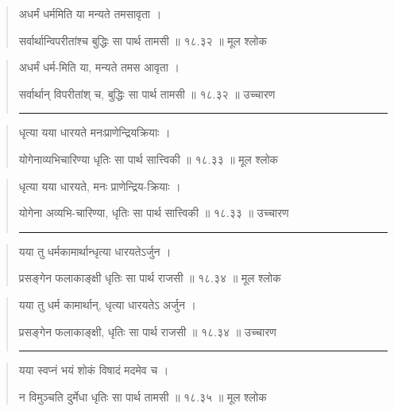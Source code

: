 \begin{quotation}

अधर्मं धर्ममिति या मन्यते तमसावृता ।  

सर्वार्थान्विपरीतांश्च बुद्धिः सा पार्थ तामसी  ॥ १८.३२ ॥  मूल श्लोक
\end{quotation}

\begin{quotation}

अधर्मं धर्म-मिति या, मन्यते तमस आवृता ।  

सर्वार्थान् विपरीतांश् च, बुद्धिः सा पार्थ तामसी  ॥ १८.३२ ॥  उच्चारण

\noindent\rule{16cm}{0.4pt} 
\end{quotation}


\begin{quotation}

धृत्या यया धारयते मनःप्राणेन्द्रियक्रियाः ।  

योगेनाव्यभिचारिण्या धृतिः सा पार्थ सात्त्विकी  ॥ १८.३३ ॥  मूल श्लोक
\end{quotation}

\begin{quotation}

धृत्या यया धारयते, मनः प्राणेन्द्रिय-क्रियाः ।  

योगेना अव्यभि-चारिण्या, धृतिः सा पार्थ सात्त्विकी  ॥ १८.३३ ॥  उच्चारण

\noindent\rule{16cm}{0.4pt} 
\end{quotation}


\begin{quotation}

यया तु धर्मकामार्थान्धृत्या धारयतेऽर्जुन ।  

प्रसङ्‍गेन फलाकाङ्क्षी धृतिः सा पार्थ राजसी  ॥ १८.३४ ॥  मूल श्लोक
\end{quotation}

\begin{quotation}

यया तु धर्म कामार्थान्, धृत्या धारयतेऽ अर्जुन ।  

प्रसङ्‍गेन फलाकाङ्क्षी, धृतिः सा पार्थ राजसी  ॥ १८.३४ ॥  उच्चारण

\noindent\rule{16cm}{0.4pt} 
\end{quotation}


\begin{quotation}

यया स्वप्नं भयं शोकं विषादं मदमेव च ।  

न विमुञ्चति दुर्मेधा धृतिः सा पार्थ तामसी  ॥ १८.३५ ॥  मूल श्लोक
\end{quotation}

